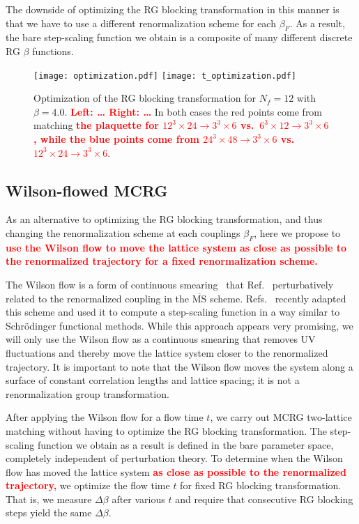 \documentclass{PoS}
\newcommand{\be}{\ensuremath{\beta} }
\newcommand{\De}{\ensuremath{\Delta} }
\newcommand{\X}{\ensuremath{\!\times\!} }
\newcommand{\MSbar}{\ensuremath{\overline{\textrm{MS}}} }
\newcommand{\refcite}[1]{Ref.~\cite{#1}}
\newcommand{\TODO}[1]{\textcolor{red}{{\bf #1}}}
\begin{document}
The downside of optimizing the RG blocking transformation in this manner is that we have to use a different renormalization scheme for each $\be_F$.
As a result, the bare step-scaling function we obtain is a composite of many different discrete RG \be functions.

\begin{figure}[htpb]
  \centering
  \texttt{[image: optimization.pdf]}\hfill
  \texttt{[image: t\_optimization.pdf]}
  \caption{Optimization of the RG blocking transformation for $N_f = 12$ with $\be = 4.0$.  \TODO{Left: \dots
  Right: \dots}
  In both cases the red points come from matching \TODO{the plaquette for $12^3\X24 \to 3^3\X6$ vs.\ $6^3\X12 \to 3^3\X6$, while the blue points come from $24^3\X48 \to 3^3\X6$ vs.\ $12^3\X24 \to 3^3\X6$}.}
  \label{fig:opt}
\end{figure}



\subsection{\label{sec:WMCRG}Wilson-flowed MCRG} %
As an alternative to optimizing the RG blocking transformation, and thus changing the renormalization scheme at each couplings $\be_F$, here we propose to \TODO{use the Wilson flow to move the lattice system as close as possible to the renormalized trajectory for a fixed renormalization scheme.}

The Wilson flow is a form of continuous smearing~\cite{Narayanan:2006rf} that \refcite{Luscher:2010iy} perturbatively related to the renormalized coupling in the \MSbar scheme.
Refs.~\cite{Fodor:2012td, Fodor:2012qh} recently adapted this scheme and used it to compute a step-scaling function in a way similar to Schr\"odinger functional methods.
While this approach appears very promising, we will only use the Wilson flow as a continuous smearing that removes UV fluctuations and thereby move the lattice system closer to the renormalized trajectory.
It is important to note that the Wilson flow moves the system along a surface of constant correlation lengths and lattice spacing; it is not a renormalization group transformation.

After applying the Wilson flow for a flow time $t$, we carry out MCRG two-lattice matching without having to optimize the RG blocking transformation.
The step-scaling function we obtain as a result is defined in the bare parameter space, completely independent of perturbation theory.
To determine when the Wilson flow has moved the lattice system \TODO{as close as possible to the renormalized trajectory,} we optimize the flow time $t$ for fixed RG blocking transformation.
That is, we measure $\De\be$ after various $t$ and require that consecutive RG blocking steps yield the same $\De\be$.
\end{document}
